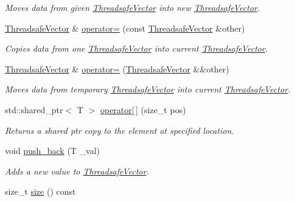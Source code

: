 \begin{DoxyCompactItemize}
\begin{DoxyCompactList}\small\item\em Moves data from given \hyperlink{classHatchit_1_1Core_1_1ThreadsafeVector}{Threadsafe\+Vector} into new \hyperlink{classHatchit_1_1Core_1_1ThreadsafeVector}{Threadsafe\+Vector}. \end{DoxyCompactList}\item 
\hyperlink{classHatchit_1_1Core_1_1ThreadsafeVector}{Threadsafe\+Vector} \& \hyperlink{classHatchit_1_1Core_1_1ThreadsafeVector_a0aa4b89e8f6b3f9472a7e5415e5d79b1}{operator=} (const \hyperlink{classHatchit_1_1Core_1_1ThreadsafeVector}{Threadsafe\+Vector} \&other)
\begin{DoxyCompactList}\small\item\em Copies data from one \hyperlink{classHatchit_1_1Core_1_1ThreadsafeVector}{Threadsafe\+Vector} into current \hyperlink{classHatchit_1_1Core_1_1ThreadsafeVector}{Threadsafe\+Vector}. \end{DoxyCompactList}\item 
\hyperlink{classHatchit_1_1Core_1_1ThreadsafeVector}{Threadsafe\+Vector} \& \hyperlink{classHatchit_1_1Core_1_1ThreadsafeVector_a8304a6dfe56e1af8e4ae6598d9250316}{operator=} (\hyperlink{classHatchit_1_1Core_1_1ThreadsafeVector}{Threadsafe\+Vector} \&\&other)
\begin{DoxyCompactList}\small\item\em Moves data from temporary \hyperlink{classHatchit_1_1Core_1_1ThreadsafeVector}{Threadsafe\+Vector} into current \hyperlink{classHatchit_1_1Core_1_1ThreadsafeVector}{Threadsafe\+Vector}. \end{DoxyCompactList}\item 
std\+::shared\+\_\+ptr$<$ T $>$ \hyperlink{classHatchit_1_1Core_1_1ThreadsafeVector_af1b460bf351cd2b73fa442a1fcce22cc}{operator\mbox{[}$\,$\mbox{]}} (size\+\_\+t pos)
\begin{DoxyCompactList}\small\item\em Returns a shared ptr copy to the element at specified location. \end{DoxyCompactList}\item 
void \hyperlink{classHatchit_1_1Core_1_1ThreadsafeVector_a8ca2359c9f28554e298d034e47ab84f9}{push\+\_\+back} (T \+\_\+val)\hypertarget{classHatchit_1_1Core_1_1ThreadsafeVector_a8ca2359c9f28554e298d034e47ab84f9}{}\label{classHatchit_1_1Core_1_1ThreadsafeVector_a8ca2359c9f28554e298d034e47ab84f9}

\begin{DoxyCompactList}\small\item\em Adds a new value to \hyperlink{classHatchit_1_1Core_1_1ThreadsafeVector}{Threadsafe\+Vector}. \end{DoxyCompactList}\item 
size\+\_\+t \hyperlink{classHatchit_1_1Core_1_1ThreadsafeVector_a262f6ae1582a59545c0f604983f4aa0f}{size} () const \hypertarget{classHatchit_1_1Core_1_1ThreadsafeVector_a262f6ae1582a59545c0f604983f4aa0f}{}\label{classHatchit_1_1Core_1_1ThreadsafeVector_a262f6ae1582a59545c0f604983f4aa0f}


\end{DoxyCompactItemize}
